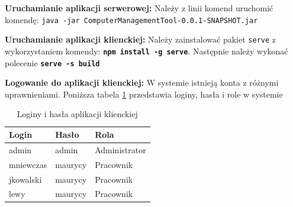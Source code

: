 \textbf{Uruchamianie aplikacji serwerowej:}
Należy z linii komend uruchomić komendę: \mbox{\texttt{java -jar ComputerManagementTool-0.0.1-SNAPSHOT.jar}}

\textbf{Uruchamianie aplikacji klienckiej:}
Należy zainstalować pakiet \texttt{serve} z wykorzystaniem komendy: \textbf{\texttt{npm install -g serve}}. Następnie należy wykonać polecenie \textbf{\texttt{serve -s build}}

\textbf{Logowanie do aplikacji klienckiej:}
W systemie istnieją konta z różnymi uprawnieniami. Poniższa tabela \ref{tab:loginKlient} przedstawia loginy, hasła i role w systemie
 

\begin{table}[htb] \small
	\centering
\caption{Loginy i hasła aplikacji klienckiej}
\label{tab:loginKlient}
\begin{tabularx}{0.5\linewidth}{|X|X|X|}
		\hline
    Login & Hasło & Rola \\
		\hline
    admin & admin & Administrator\\
    \hline
    mniewczas & maurycy & Pracownik \\
    \hline
    jkowalski & maurycy &  Pracownik \\
    \hline
    lewy & maurycy & Pracownik \\
    \hline
\end{tabularx}
\end{table}




















